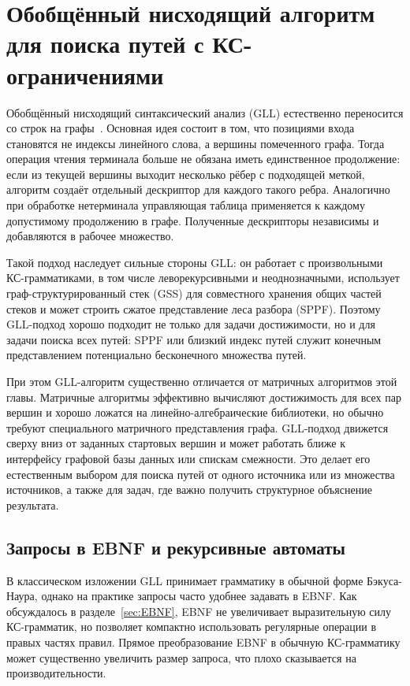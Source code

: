 \section{Обобщённый нисходящий алгоритм для поиска путей с КС-ограничениями}
\label{sec:CFPQ_GLL}


Обобщённый нисходящий синтаксический анализ (GLL) естественно переносится со строк на графы~. Основная идея состоит в том, что позициями входа становятся не индексы линейного слова, а вершины помеченного графа. Тогда операция чтения терминала больше не обязана иметь единственное продолжение: если из текущей вершины выходит несколько рёбер с подходящей меткой, алгоритм создаёт отдельный дескриптор для каждого такого ребра. Аналогично при обработке нетерминала управляющая таблица применяется к каждому допустимому продолжению в графе. Полученные дескрипторы независимы и добавляются в рабочее множество.

Такой подход наследует сильные стороны GLL: он работает с произвольными КС-грамматиками, в том числе леворекурсивными и неоднозначными, использует граф-структурированный стек (GSS) для совместного хранения общих частей стеков и может строить сжатое представление леса разбора (SPPF). Поэтому GLL-подход хорошо подходит не только для задачи достижимости, но и для задачи поиска всех путей: SPPF или близкий индекс путей служит конечным представлением потенциально бесконечного множества путей.

При этом GLL-алгоритм существенно отличается от матричных алгоритмов этой главы. Матричные алгоритмы эффективно вычисляют достижимость для всех пар вершин и хорошо ложатся на линейно-алгебраические библиотеки, но обычно требуют специального матричного представления графа. GLL-подход движется сверху вниз от заданных стартовых вершин и может работать ближе к интерфейсу графовой базы данных или спискам смежности. Это делает его естественным выбором для поиска путей от одного источника или из множества источников, а также для задач, где важно получить структурное объяснение результата.

\subsection{Запросы в EBNF и рекурсивные автоматы}
\label{subsec:CFPQ_GLL_RSM}

В классическом изложении GLL принимает грамматику в обычной форме Бэкуса-Наура, однако на практике запросы часто удобнее задавать в EBNF. Как обсуждалось в разделе~\ref{sec:EBNF}, EBNF не увеличивает выразительную силу КС-грамматик, но позволяет компактно использовать регулярные операции в правых частях правил. Прямое преобразование EBNF в обычную КС-грамматику может существенно увеличить размер запроса, что плохо сказывается на производительности.

